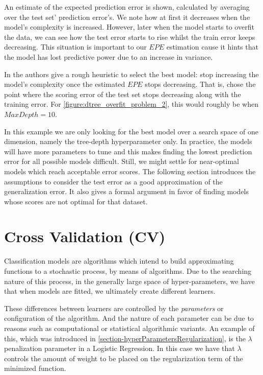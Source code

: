An estimate of the expected prediction error is shown, calculated by averaging over the test set' prediction error's.
We note how at first it decreases when the model's complexity is increased.
However, later when the model starts to overfit the data, we can see how the test error starts to rise whilst the train error keeps decreasing.
This situation is important to our $EPE$ estimation cause it hints that the model has lost predictive power due to an increase in variance.

In \protect\citep{hastie-elemstatslearn} the authors give a rough heuristic to select the best model: stop increasing the model's complexity once the estimated $EPE$ stops decreasing.
That is, chose the point where the scoring error of the test set stops decreasing along with the training error.
For \cref{figure:dtree_overfit_problem_2}, this would roughly be when $Max Depth = 10$.

In this example we are only looking for the best model over a search space of one dimension, namely the tree-depth hyperparameter only.
In practice, the models will have more parameters to tune and this makes finding the lowest prediction error for all possible models difficult.
Still, we might settle for near-optimal models which reach acceptable error scores.
The following section introduces the assumptions to consider the test error as a good approximation of the generalization error.
It also gives a formal argument in favor of finding models whose scores are not optimal for that dataset.


\section{Cross Validation (CV)}\label{section:crossValidation}

Classification models are algorithms which intend to build approximating functions to a stochastic process, by means of algorithms.
Due to the searching nature of this process, in the generally large space of hyper-parameters, we have that when models are fitted, we ultimately create different learners.

These differences between learners are controlled by the \textit{parameters} or configuration of the algorithm.
And the nature of each parameter can be due to reasons such as computational or statistical  algorithmic variants.
An example of this, which was introduced in \cref{section-hyperParametersRegularization}, is the $\lambda$ penalization parameter in a Logistic Regression.
In this case we have that $\lambda$ controls the amount of weight to be placed on the regularization term of the minimized function.


